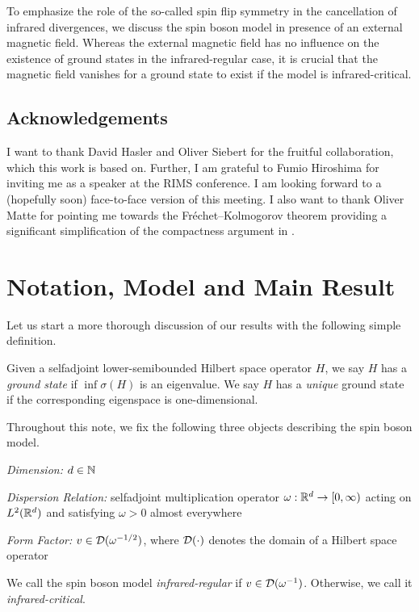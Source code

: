 \documentclass[a4paper,12pt,oneside]{article}
\begin{document}
To emphasize the role of the so-called spin flip symmetry in the cancellation of infrared divergences, we discuss the spin boson model in presence of an external magnetic field. Whereas the external magnetic field has no influence on the existence of ground states in the infrared-regular case, it is crucial that the magnetic field vanishes for a ground state to exist if the model is infrared-critical.

\subsection*{Acknowledgements}

I want to thank David Hasler and Oliver Siebert for the fruitful collaboration, which this work is based on. Further, I am grateful to Fumio Hiroshima for inviting me as a speaker at the RIMS conference. I am looking forward to a (hopefully soon) face-to-face version of this meeting. I also want to thank Oliver Matte for pointing me towards the Fr\'echet--Kolmogorov theorem providing a significant simplification of the compactness argument in \cite{HaslerHinrichsSiebert.2021a}.

\section{Notation, Model and Main Result}
%
Let us start a more thorough discussion of our results with the following simple definition.
\begin{defn}
	Given a selfadjoint lower-semibounded  Hilbert space operator $H$, we say $H$ has a {\em ground state} if $\inf \sigma(H)$ is an eigenvalue. We say $H$ has a {\em unique} ground state if the corresponding eigenspace is one-dimensional.
\end{defn}
%
Throughout this note, we fix the following three objects describing the spin boson model.
\begin{description}
	\item{\em Dimension:} $d\in{\mathbb N}$
	\item{\em Dispersion Relation:} selfadjoint multiplication operator $\omega:{\mathbb R}^d\to[0,\infty)$ acting on $L^2({\mathbb R}^d)$ and satisfying $\omega>0$ almost everywhere
	\item{\em Form Factor:} $v\in {\mathcal D}(\omega^{-1/2})$, where ${\mathcal D}(\cdot)$ denotes the domain of a Hilbert space operator
\end{description}
We call the spin boson model {\em infrared-regular} if $v\in{\mathcal D}(\omega^{-1})$. Otherwise, we call it {\em infrared-critical}.
\end{document}
